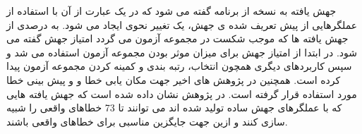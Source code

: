 جهش یافته به نسخه از برنامه گفته می شود که در یک عبارت از آن با استفاده از عملگرهایی از پیش تعریف شده ی جهش، یک تغییر نحوی ایجاد می شود. به درصدی از جهش یافته ها که موجب شکست در مجموعه آزمون می گردد امتیاز جهش گفته می شود. در ابتدا از امتیاز جهش برای میزان موثر بودن مجموعه آزمون استفاده می شد و سپس کاربردهای دیگری همچون انتخاب، رتبه بندی و کمینه کردن مجموعه آزمون پیدا کرده است. همچنین در پژوهش های اخیر جهت مکان یابی خطا و  و پیش بینی خطا مورد استفاده قرار گرفته است. در پژوهش \cite{just2014mutants} نشان داده شده است که جهش یافته هایی  که با عملگرهای جهش ساده تولید شده اند می توانند تا 73 \lr{\%} خطاهای واقعی را شبیه سازی کنند و ازین جهت جایگزین مناسبی برای خطاهای واقعی باشند. 











